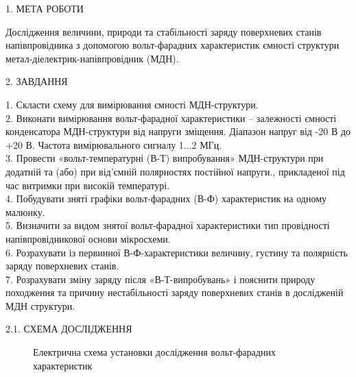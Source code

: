 \documentclass[a4paper,14pt]{extreport}
\begin{document}
\begin{center}1. МЕТА РОБОТИ\\ \end{center}

Дослідження величини, природи та стабільності заряду поверхневих
станів напівпровідника з допомогою вольт-фарадних характеристик ємності
структури метал-діелектрик-напівпровідник (МДН).

\begin{center}2. ЗАВДАННЯ\\ \end{center}

	1. Скласти схему для вимірювання ємності МДН-структури.\\

	2. Виконати вимірювання вольт-фарадної характеристики – залежності 
	ємності конденсатора МДН-структури від напруги зміщення. Діапазон напруг 
	від -20 В до +20 В. Частота вимірювального сигналу 1...2 МГц.\\

	3. Провести «вольт-температурні (В-Т) випробування» МДН-структури 
	при додатній та (або) при від’ємній полярностях постійної напруги., 
	прикладеної під час витримки при високій температурі.\\

	4. Побудувати зняті графіки вольт-фарадних (В-Ф) характеристик на 
	одному малюнку.\\

	5. Визначити за видом знятої вольт-фарадної характеристики тип 
	провідності напівпровідникової основи мікросхеми.\\

	6. Розрахувати із первинної В-Ф-характеристики величину, густину та 
	полярність заряду поверхневих станів.\\

	7. Розрахувати зміну заряду після «В-Т-випробувань» і пояснити природу 
	походження та причину нестабільності заряду поверхневих станів в 
	дослідженій МДН структури.



\newpage
\begin{center}2.1. СХЕМА ДОСЛІДЖЕННЯ\\ \end{center}

\begin{figure}[h]
\caption{Електрична схема установки дослідження вольт-фарадних 
характеристик}
\label{ris1}
\end{figure}
\end{document}

